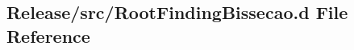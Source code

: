 \hypertarget{RootFindingBissecao_8d}{
\subsection{Release/src/RootFindingBissecao.d File Reference}
\label{RootFindingBissecao_8d}
}

